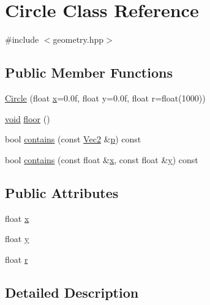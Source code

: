 \hypertarget{class_circle}{\section{Circle Class Reference}
\label{class_circle}
}


{\ttfamily \#include $<$geometry.\-hpp$>$}

\subsection*{Public Member Functions}
\begin{DoxyCompactItemize}
\item 
\hyperlink{class_circle_a5a1dcf77133ac902986f3d43430d0b70}{Circle} (float \hyperlink{_s_d_l__opengl_8h_ad0e63d0edcdbd3d79554076bf309fd47}{x}=0.\-0f, float y=0.\-0f, float r=float(1000))
\item 
\hyperlink{_s_d_l__opengles2__gl2ext_8h_ae5d8fa23ad07c48bb609509eae494c95}{void} \hyperlink{class_circle_aedb9b76950b51fa3b7742897d39866b4}{floor} ()
\item 
bool \hyperlink{class_circle_a9955fe66a090007b539929c8aad878d2}{contains} (const \hyperlink{class_vec2}{Vec2} \&\hyperlink{_s_d_l__opengl__glext_8h_aa5367c14d90f462230c2611b81b41d23}{p}) const 
\item 
bool \hyperlink{class_circle_a73a8e33dcbee2e86720e2b69e2ac74f1}{contains} (const float \&\hyperlink{_s_d_l__opengl_8h_ad0e63d0edcdbd3d79554076bf309fd47}{x}, const float \&\hyperlink{_s_d_l__opengl_8h_a1675d9d7bb68e1657ff028643b4037e3}{y}) const 
\end{DoxyCompactItemize}
\subsection*{Public Attributes}
\begin{DoxyCompactItemize}
\item 
float \hyperlink{class_circle_a017e2f5ddc49b63f9b3a3793ec362eb7}{x}
\item 
float \hyperlink{class_circle_af86ea96e8ba78e996368316476033cff}{y}
\item 
float \hyperlink{class_circle_a7bdbdaf7361494f294d9a18626d7500f}{r}
\end{DoxyCompactItemize}


\subsection{Detailed Description}


